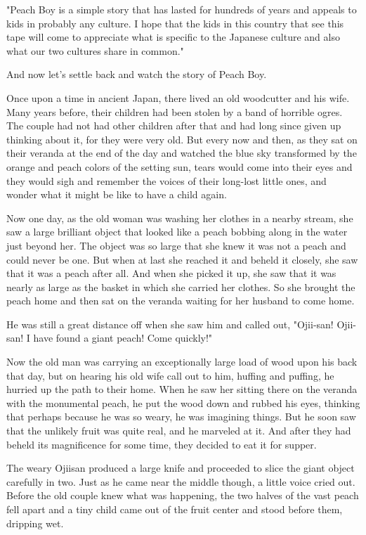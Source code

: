 "Peach Boy is a simple story that has lasted for hundreds of years and appeals to kids in probably any culture. I hope that the kids in this country that see this tape will come to appreciate what is specific to the Japanese culture and also what our two cultures share in common."

And now let's settle back and watch the story of Peach Boy.

Once upon a time in ancient Japan, there lived an old woodcutter and his wife. Many years before, their children had been stolen by a band of horrible ogres. The couple had not had other children after that and had long since given up thinking about it, for they were very old. But every now and then, as they sat on their veranda at the end of the day and watched the blue sky transformed by the orange and peach colors of the setting sun, tears would come into their eyes and they would sigh and remember the voices of their long-lost little ones, and wonder what it might be like to have a child again.

Now one day, as the old woman was washing her clothes in a nearby stream, she saw a large brilliant object that looked like a peach bobbing along in the water just beyond her. The object was so large that she knew it was not a peach and could never be one. But when at last she reached it and beheld it closely, she saw that it was a peach after all. And when she picked it up, she saw that it was nearly as large as the basket in which she carried her clothes. So she brought the peach home and then sat on the veranda waiting for her husband to come home.

He was still a great distance off when she saw him and called out, "Ojii-san! Ojii-san! I have found a giant peach! Come quickly!"

Now the old man was carrying an exceptionally large load of wood upon his back that day, but on hearing his old wife call out to him, huffing and puffing, he hurried up the path to their home. When he saw her sitting there on the veranda with the monumental peach, he put the wood down and rubbed his eyes, thinking that perhaps because he was so weary, he was imagining things. But he soon saw that the unlikely fruit was quite real, and he marveled at it. And after they had beheld its magnificence for some time, they decided to eat it for supper.

The weary Ojiisan produced a large knife and proceeded to slice the giant object carefully in two. Just as he came near the middle though, a little voice cried out. Before the old couple knew what was happening, the two halves of the vast peach fell apart and a tiny child came out of the fruit center and stood before them, dripping wet.

